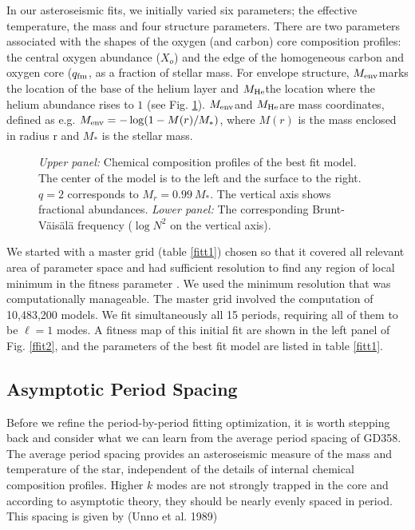 \documentclass[12pt,preprint]{aastex}
\newcommand{\bvf}{Brunt-V\"ais\"al\"a }
\newcommand{\menv}{$M_{\rm env}$}
\newcommand{\mhe}{$M_{\rm He}$}
\newcommand{\xo}{$X_o$}
\newcommand{\qfm}{$q_{\rm fm}$}
\begin{document}
In our asteroseismic fits, we initially varied six parameters; the effective temperature, 
the mass and four structure parameters. There are two parameters associated with the shapes 
of the oxygen (and carbon) core composition profiles: the central oxygen abundance (\xo) and 
the edge of the homogeneous carbon and oxygen core (\qfm, as a fraction of stellar mass. 
For envelope structure, \menv marks the location of the base of the helium layer 
and \mhe the location where the helium abundance rises to $1$ (see Fig. \ref{ffit1}). 
\menv and \mhe are mass coordinates, defined as e.g. $M_{\rm env} = -\log(1 - M(r)/M_*)$, 
where $M(r)$ is the mass enclosed in radius r and $M_*$ is the stellar mass. 

\begin{figure}
\caption{
{\em Upper panel:} Chemical composition profiles of the best fit model. The center of the model is to the left and the surface to the right.  $q=2$ corresponds to $M_r = 0.99 \: M_*$. The vertical axis shows fractional abundances. 
{\em Lower panel:} The corresponding \bvf frequency ($\log{N^2}$ on the vertical axis). \label{ffit1}
}
\end{figure}

We started with a master grid (table \ref{fitt1}) chosen so that it covered all relevant 
area of parameter space and had sufficient resolution to find any region of local minimum in the fitness parameter \citep{Bischoff-Kim11a,Bischoff-Kim14}. We used the minimum resolution that was computationally manageable. The master grid involved the computation 
of 10,483,200 models. We fit simultaneously all 15 periods, requiring all of them to be $\ell=1$ 
modes. A fitness map of this initial fit are shown in the left panel of Fig. \ref{ffit2}, and the parameters of the best fit model are listed in table \ref{fitt1}.

\subsection{Asymptotic Period Spacing}
\label{periodspacing}

Before we refine the period-by-period fitting optimization, it is worth stepping back and consider 
what we can learn from the average period spacing of GD358. The average period spacing provides an asteroseismic measure of the mass and temperature of the star, independent of the details of 
internal chemical composition profiles. Higher $k$ modes are not strongly trapped in the core and 
according to asymptotic theory, they should be nearly evenly spaced in period. This spacing is 
given by (Unno et al. 1989)
\end{document}
